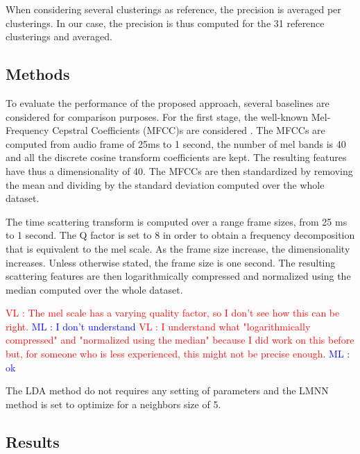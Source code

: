 \documentclass{article}
\newcommand{\ml}[1]{\textcolor{blue}{ML : #1}}
\newcommand{\vl}[1]{\textcolor{red}{VL : #1}}
\begin{document}
When considering several clusterings as reference, the precision is averaged per clusterings. In our case, the precision is thus computed for the 31 reference clusterings and averaged.

\subsection{Methods}

To evaluate the performance of the proposed approach, several baselines are considered for comparison purposes. For the first stage, the well-known Mel-Frequency Cepstral Coefficients (MFCC)s are considered \cite{rabiner1993fundamentals}. The MFCCs are computed from audio frame of 25ms to 1 second, the number of mel bands is 40 and all the discrete cosine transform coefficients are kept. The resulting features have thus a dimensionality of 40. The MFCCs are then standardized by removing the mean and dividing by the standard deviation computed over the whole dataset.

The time scattering transform is computed over a range frame sizes, from 25 ms to 1 second. The Q factor is set to 8 in order to obtain a frequency decomposition that is equivalent to the mel scale. As the frame size increase, the dimensionality increases. Unless otherwise stated, the frame size is one second. The resulting scattering features are then logarithmically compressed and normalized using the median computed over the whole dataset.

\vl{The mel scale has a varying quality factor, so I don't see how this can be right.}
\ml{I don't understand}
\vl{I understand what "logarithmically compressed" and "normalized using the median" because I did work on this before but,
for someone who is less experienced, this might not be precise enough.}
\ml{ok}

The LDA method do not requires any setting of parameters and the LMNN method is set to optimize for a neighbors size of 5.

\subsection{Results}
\end{document}
